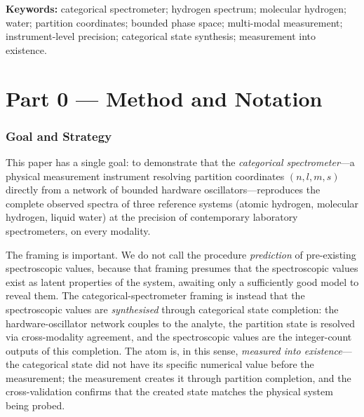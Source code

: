 \documentclass[11pt,a4paper]{article}
\theoremstyle{stmtstyle}
\theoremstyle{definition}
\theoremstyle{remark}
\begin{document}
\noindent\textbf{Keywords:} categorical spectrometer; hydrogen spectrum; molecular hydrogen; water; partition coordinates; bounded phase space; multi-modal measurement; instrument-level precision; categorical state synthesis; measurement into existence.

\vspace{6pt}
\tableofcontents
\vspace{6pt}

\clearpage

\part*{Part 0 --- Method and Notation}

\section{Goal and Strategy}
\label{sec:goal}

This paper has a single goal: to demonstrate that the \emph{categorical spectrometer}---a physical measurement instrument resolving partition coordinates $(n,l,m,s)$ directly from a network of bounded hardware oscillators---reproduces the complete observed spectra of three reference systems (atomic hydrogen, molecular hydrogen, liquid water) at the precision of contemporary laboratory spectrometers, on every modality.

The framing is important. We do not call the procedure \emph{prediction} of pre-existing spectroscopic values, because that framing presumes that the spectroscopic values exist as latent properties of the system, awaiting only a sufficiently good model to reveal them. The categorical-spectrometer framing is instead that the spectroscopic values are \emph{synthesised} through categorical state completion: the hardware-oscillator network couples to the analyte, the partition state is resolved via cross-modality agreement, and the spectroscopic values are the integer-count outputs of this completion. The atom is, in this sense, \emph{measured into existence}---the categorical state did not have its specific numerical value before the measurement; the measurement creates it through partition completion, and the cross-validation confirms that the created state matches the physical system being probed.
\end{document}
